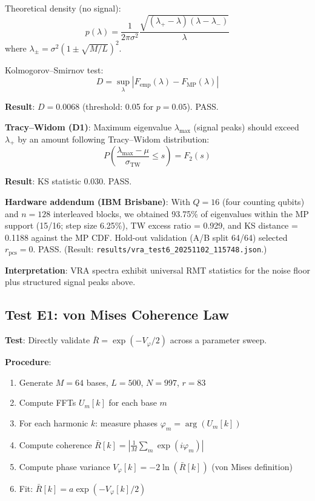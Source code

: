\documentclass[10pt,twocolumn]{article}
\begin{document}
Theoretical density (no signal):
\begin{equation}
p(\lambda) = \frac{1}{2\pi\sigma^2} \frac{\sqrt{(\lambda_+ - \lambda)(\lambda - \lambda_-)}}{\lambda}
\end{equation}
where $\lambda_\pm = \sigma^2(1 \pm \sqrt{M/L})^2$.

Kolmogorov--Smirnov test:
\begin{equation}
D = \sup_\lambda |F_{\text{emp}}(\lambda) - F_{\text{MP}}(\lambda)|
\end{equation}

\textbf{Result}: $D = 0.0068$ (threshold: 0.05 for $p = 0.05$). PASS.

\textbf{Tracy--Widom (D1)}: Maximum eigenvalue $\lambda_{\max}$ (signal peaks) should exceed $\lambda_+$ by an amount following Tracy--Widom distribution:
\begin{equation}
P\left(\frac{\lambda_{\max} - \mu}{\sigma_{\text{TW}}} \le s\right) = F_2(s)
\end{equation}

\textbf{Result}: KS statistic 0.030. PASS.

\textbf{Hardware addendum (IBM Brisbane)}: With $Q = 16$ (four counting qubits) and $n = 128$ interleaved blocks, we obtained 93.75\% of eigenvalues within the MP support (15/16; step size 6.25\%), TW excess ratio = 0.929, and KS distance = 0.1188 against the MP CDF. Hold-out validation (A/B split 64/64) selected $r_{\text{pcs}} = 0$. PASS. (Result: \texttt{results/vra\_test6\_20251102\_115748.json}.)

\textbf{Interpretation}: VRA spectra exhibit universal RMT statistics for the noise floor plus structured signal peaks above.

\subsection{Test E1: von Mises Coherence Law}

\textbf{Test}: Directly validate $\bar{R} = \exp({-}V_\varphi/2)$ across a parameter sweep.

\textbf{Procedure}:
\begin{enumerate}
\item Generate $M = 64$ bases, $L = 500$, $N = 997$, $r = 83$
\item Compute FFTs $U_m[k]$ for each base $m$
\item For each harmonic $k$: measure phases $\varphi_m = \arg(U_m[k])$
\item Compute coherence $\bar{R}[k] = |\frac{1}{M} \sum_m \exp(i\varphi_m)|$
\item Compute phase variance $V_\varphi[k] = {-}2 \ln(\bar{R}[k])$ (von Mises definition)
\item Fit: $\bar{R}[k] = a \exp({-}V_\varphi[k]/2)$
\end{enumerate}
\end{document}
